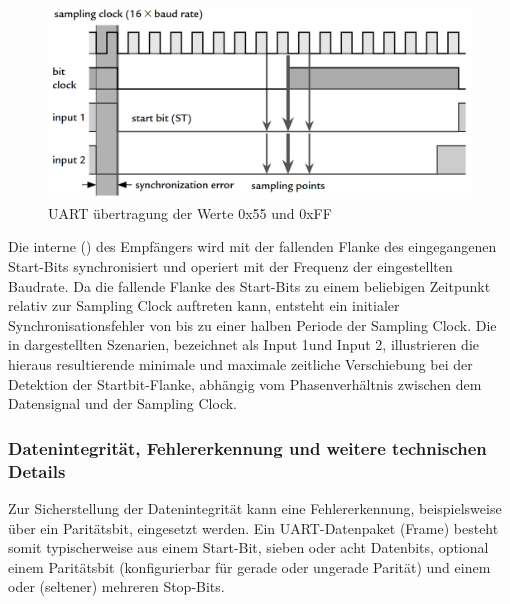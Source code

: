 \begin{figure}[h!]
	\centering
	\includegraphics[width=1.0\textwidth]{../Bilder/uart_protocoll.png}
	\caption{UART \"ubertragung der Werte 0x55 und 0xFF\\}
	\label{fig:uart_uebertragung}
\end{figure}

Die interne  () des Empf\"angers wird mit der fallenden Flanke des eingegangenen Start-Bits synchronisiert und operiert mit der Frequenz der eingestellten Baudrate. Da die fallende Flanke des Start-Bits zu einem beliebigen Zeitpunkt relativ zur Sampling Clock auftreten kann, entsteht ein initialer Synchronisationsfehler von bis zu einer halben Periode der Sampling Clock. Die in  dargestellten Szenarien, bezeichnet als \glqq Input 1\grqq und \glqq Input 2\grqq, illustrieren die hieraus resultierende minimale und maximale zeitliche Verschiebung bei der Detektion der Startbit-Flanke, abh\"angig vom Phasenverh\"altnis zwischen dem Datensignal und der Sampling Clock.

\subsubsection{Datenintegrit\"at, Fehlererkennung und weitere technischen Details}
\label{datenintegritaet}

Zur Sicherstellung der Datenintegrit\"at kann eine Fehlererkennung, beispielsweise \"uber ein Parit\"atsbit, eingesetzt werden. Ein UART-Datenpaket (Frame) besteht somit typischerweise aus einem Start-Bit, sieben oder acht Datenbits, optional einem Parit\"atsbit (konfigurierbar f\"ur gerade oder ungerade Parit\"at) und einem oder (seltener) mehreren Stop-Bits. 

